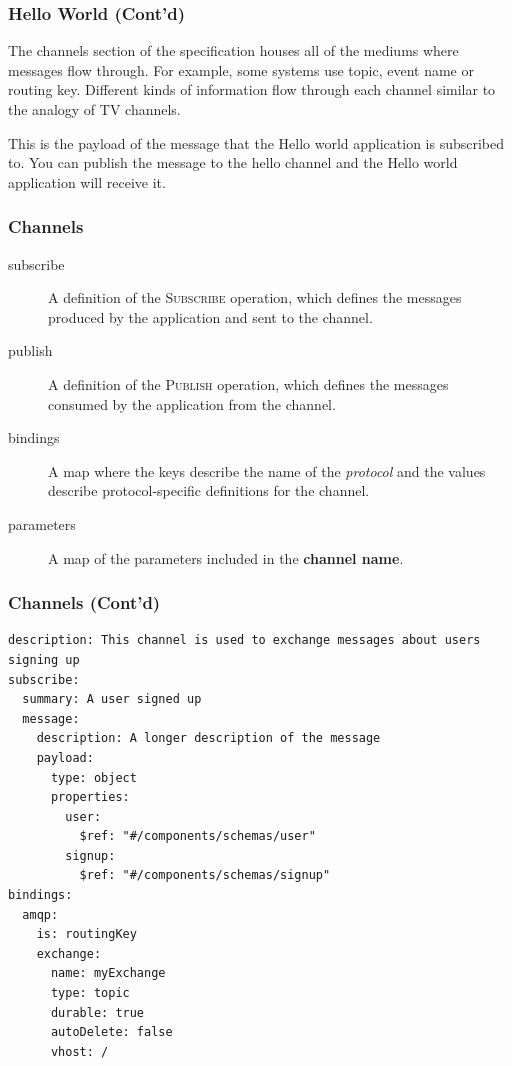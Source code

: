 \documentclass{efd-lecture}
\begin{document}
\begin{frame}[fragile]
  \frametitle{Hello World (Cont'd)}
  \begin{block}{}
    The channels section of the specification houses all of the mediums where messages flow through. For example,
    some systems use topic, event name or routing key.
    Different kinds of information flow through each channel similar to the analogy of TV channels.
  \end{block}
\end{frame}

\begin{frame}
  \begin{block}{}
    This is the payload of the message that the Hello world application is subscribed to.
    You can publish the message to the hello channel and the Hello world application will receive it.
  \end{block}
\end{frame}

\begin{frame}
  \frametitle{Channels}
  \begin{description}
    \item[subscribe] A definition of the \textsc{\color{YellowOrange}Subscribe} operation, which defines the messages produced by the application and sent to the channel.
    \item[publish] A definition of the \textsc{\color{LimeGreen}Publish} operation, which defines the messages consumed by the application from the channel.
    \item[bindings] A map where the keys describe the name of the \textit{protocol} and the values describe protocol-specific definitions for the channel.
    \item[parameters] A map of the parameters included in the \textbf{\color{Purple} channel name}.
  \end{description}
\end{frame}

\begin{frame}[fragile]
  \frametitle{Channels (Cont'd)}
  \scriptsize
  \begin{verbatim}
description: This channel is used to exchange messages about users signing up
subscribe:
  summary: A user signed up
  message:
    description: A longer description of the message
    payload:
      type: object
      properties:
        user:
          $ref: "#/components/schemas/user"
        signup:
          $ref: "#/components/schemas/signup"
bindings:
  amqp:
    is: routingKey
    exchange:
      name: myExchange
      type: topic
      durable: true
      autoDelete: false
      vhost: /
  \end{verbatim}
\end{frame}
\end{document}
